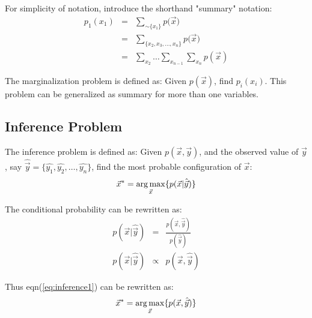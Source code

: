 For simplicity of notation, introduce the shorthand "summary" notation:
\begin{eqnarray}
	p_1(x_1) &=& \sum_{\sim\{x_1\}}{p(\vec{x}}) \\
	&=& \sum_{\{x_2,x_3,\ldots,x_n\}}{p(\vec{x}}) \\
	&=& \sum_{x_2} \ldots \sum_{x_{n-1}} \sum_{x_n}p(\vec{x}) 
	\label{eq:marginal}
\end{eqnarray}

The marginalization problem is defined as:
Given $p(\vec{x}) $, find $p_i(x_i)$. 
This problem can be generalized as summary for more than one variables. 

\subsection{Inference Problem}



The inference problem is defined as: Given $p(\vec{x},\vec{y})$, 
and the observed value of $\vec{y}$, say 
$\hat{\vec{y}}=\{\hat{y_1},\hat{y_2},\ldots, \hat{y_n}\}$, 
find the most probable configuration of $\vec{x}$:
\begin{equation}
	\vec{x}^* = \operatorname*{arg\,max}_{\vec{x}} \{ p(\vec{x}|\hat{\vec{y}}) \}
	\label{eq:inference1}
\end{equation}

The conditional probability can be rewritten as:
\begin{eqnarray}
p(\vec{x}|\hat{\vec{y}}) &=& \frac{p(\vec{x},\hat{\vec{y}})}{p(\hat{\vec{y}})} \\
p(\vec{x}|\hat{\vec{y}}) &\propto & p(\vec{x},\hat{\vec{y}})
\end{eqnarray}

Thus eqn(\ref{eq:inference1}) can be rewritten as:
\begin{equation}
	\vec{x}^* = \operatorname*{arg\,max}_{\vec{x}} \{ p(\vec{x},\hat{\vec{y}}) \}
	\label{eq:inference2}
\end{equation}


